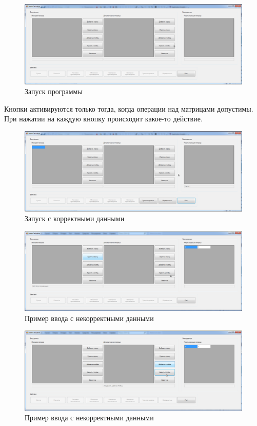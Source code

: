 \begin{figure}
\centering
\includegraphics[width=0.5\linewidth]{images//matrix-calculator/start.png}
\caption{Запуск программы}
\label{fig:matrix-calculator-start}
\end{figure}

Кнопки активируются только тогда, когда операции над матрицами допустимы.\cite{patterny-oop} При нажатии на каждую кнопку происходит какое-то действие.

\begin{figure}
\centering
\includegraphics[width=0.5\linewidth]{images//matrix-calculator/okay.png}
\caption{Запуск с корректными данными}
\label{fig:matrix-calculator-okay}
\end{figure}

\begin{figure}
\centering
\includegraphics[width=0.5\linewidth]{images//matrix-calculator/error.png}
\caption{Пример ввода с некорректными данными}
\label{fig:matrix-calculator-error}
\end{figure}

\begin{figure}
\centering
\includegraphics[width=0.5\linewidth]{images//matrix-calculator/error2.png}
\caption{Пример ввода с некорректными данными}
\label{fig:matrix-calculator-error2}
\end{figure}

